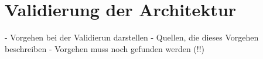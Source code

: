 \chapter{Validierung der Architektur} %
\label{cha:validierung_der_architektur}

- Vorgehen bei der Validierun darstellen
- Quellen, die dieses Vorgehen beschreiben
- Vorgehen muss noch gefunden werden (!!)

